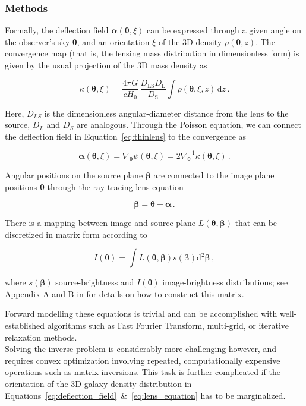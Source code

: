 \documentclass[a4paper,10pt]{article}
\begin{document}
\subsubsection*{Methods}
\label{sec:orgbc0221a}

Formally, the deflection field \(\bm\alpha(\bm\theta, \xi)\) can be
expressed through a given angle on the observer's sky \(\bm\theta\), and
an orientation \(\xi\) of the 3D density \(\rho(\bm\theta,z)\). The
convergence map (that is, the lensing mass distribution in
dimensionless form) is given by the usual projection of the 3D mass
density as

\begin{equation}
\label{eq:thinlens}
  \kappa(\bm\theta,\xi) = \frac{4\pi G}{cH_0}\, \frac{D_\mathrm{LS}D_\mathrm{L}}{D_\mathrm{S}} \int \rho(\bm\theta,\xi,z)\,\mathrm{d}z \,.
\end{equation}

Here, \(D_{LS}\) is the dimensionless angular-diameter distance from the
lens to the source, \(D_L\) and \(D_S\) are analogous.  Through the
Poisson equation, we can connect the deflection field in
Equation~\eqref{eq:thinlens} to the convergence as

\begin{equation}
\label{eq:deflection_field}
  \bm\alpha(\bm\theta,\xi) = \nabla_{\bm\theta}\psi(\bm\theta,\xi) = 2\nabla_{\bm\theta}^{-1}\kappa(\bm\theta,\xi) \,.
\end{equation}

Angular positions on the source plane \(\bm\beta\) are connected to the
image plane positions \(\bm\theta\) through the ray-tracing lens
equation

\begin{equation}
\label{eq:lens_equation}
  \bm\beta = \bm\theta - \bm\alpha \,.
\end{equation}

There is a mapping between image and source plane \(L(\bm\theta,
\bm\beta)\) that can be discretized in matrix form according to

\begin{equation}
  I(\bm\theta) = \int L(\bm\theta, \bm\beta) s(\bm\beta) \mathrm{d^{2}}\bm\beta\,,
\end{equation}

where \(s(\bm\beta)\) source-brightness and \(I(\bm\theta)\)
image-brightness distributions; see Appendix A and B in
\cite{Treu2004} for details on how to construct this matrix.

Forward modelling these equations is trivial and can be accomplished
with well-established algorithms such as Fast Fourier Transform,
multi-grid, or iterative relaxation methods. \\[0pt]
Solving the inverse problem is considerably more challenging however,
and requires convex optimization involving repeated, computationally
expensive operations such as matrix inversions. This task is further
complicated if the orientation of the 3D galaxy density distribution
in
Equations~\eqref{eq:deflection_field}~\&~\eqref{eq:lens_equation}
has to be marginalized.
\end{document}
